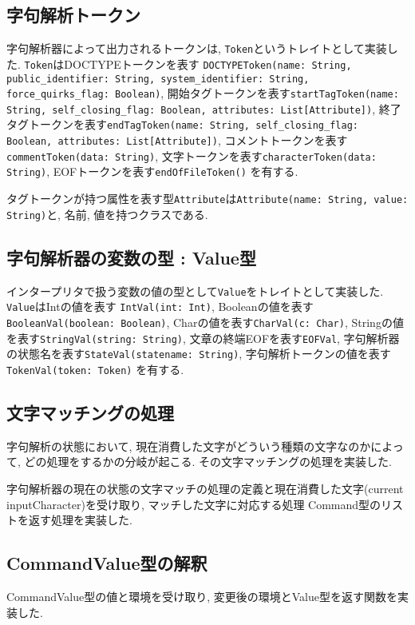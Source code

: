 \documentclass[uplatex,a4j]{jsreport}
\begin{document}
\subsection{字句解析トークン}
字句解析器によって出力されるトークンは, \texttt{Token}というトレイトとして実装した. 
\texttt{Token}はDOCTYPEトークンを表す \texttt{DOCTYPEToken(name: String, public_identifier: String, system_identifier: String, force_quirks_flag: Boolean)}, 
開始タグトークンを表す\texttt{startTagToken(name: String, self_closing_flag: Boolean, attributes: List[Attribute])}, 
終了タグトークンを表す\texttt{endTagToken(name: String, self_closing_flag: Boolean, attributes: List[Attribute])}, 
コメントトークンを表す\texttt{commentToken(data: String)}, 
文字トークンを表す\texttt{characterToken(data: String)}, 
EOFトークンを表す\texttt{endOfFileToken()} 
を有する. 

タグトークンが持つ属性を表す型\texttt{Attribute}は\texttt{Attribute(name: String, value: String)}と, 名前,  値を持つクラスである. 

\subsection{字句解析器の変数の型 : Value型}
インタープリタで扱う変数の値の型として\texttt{Value}をトレイトとして実装した. 
\texttt{Value}はIntの値を表す \texttt{IntVal(int: Int)}, 
Booleanの値を表す\texttt{BooleanVal(boolean: Boolean)}, 
Charの値を表す\texttt{CharVal(c: Char)}, 
Stringの値を表す\texttt{StringVal(string: String)}, 
文章の終端EOFを表す\texttt{EOFVal}, 
字句解析器の状態名を表す\texttt{StateVal(statename: String)}, 
字句解析トークンの値を表す\texttt{TokenVal(token: Token)} 
を有する.

\subsection{文字マッチングの処理}
字句解析の状態において, 
現在消費した文字がどういう種類の文字なのかによって, どの処理をするかの分岐が起こる. その文字マッチングの処理を実装した. 

字句解析器の現在の状態の文字マッチの処理の定義と現在消費した文字(current inputCharacter)を受け取り, 
マッチした文字に対応する処理 Command型のリストを返す処理を実装した. 

\subsection{CommandValue型の解釈}
CommandValue型の値と環境を受け取り, 変更後の環境とValue型を返す関数を実装した.
\end{document}
